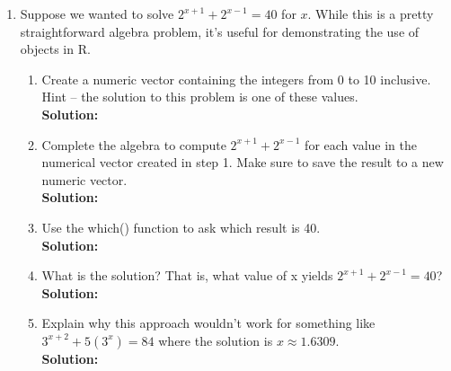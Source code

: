 \documentclass{article}\usepackage[]{graphicx}\usepackage[]{xcolor}
\begin{document}
\begin{enumerate}
\item Suppose we wanted to solve $2^{x+1} +2^{x-1} = 40$ for $x$. While this is a pretty straightforward algebra problem, it's useful for demonstrating the use of objects in R. 
  \begin{enumerate}
  \item Create a numeric vector containing the integers from 0 to 10 inclusive. Hint -- the solution to this problem is one of these values.\\
\textbf{Solution:}
  \item Complete the algebra to compute $2^{x+1} +2^{x-1}$ for each value in the numerical vector created in step 1. Make sure to save the result to a new numeric vector.\\
\textbf{Solution:}
  \item Use the which() function to ask which result is 40.\\
\textbf{Solution:}
  \item What is the solution? That is, what value of x yields $2^{x+1} +2^{x-1} = 40$?\\
\textbf{Solution:}
  \item Explain why this approach wouldn't work for something like $3^{x+2} + 5 (3^x) = 84$ where the solution is $x \approx 1.6309$.\\
\textbf{Solution:}
\end{enumerate}
\end{enumerate}
\end{document}
